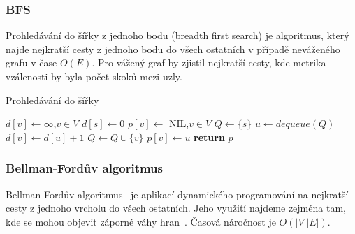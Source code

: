 \documentclass{bakalarka}
\begin{document}
\subsubsection{BFS}
Prohledávání do šířky z jednoho bodu (breadth first search) je algoritmus,
který najde nejkratší cesty z jednoho bodu do všech ostatních v případě
neváženého grafu v čase $O(E)$. Pro vážený graf by zjistil nejkratší cesty, kde
metrika vzálenosti by byla počet skoků mezi uzly.

\begin{center}
\begin{minipage}{\textwidth}
\begin{algorithm}[H]
	\caption{Prohledávání do šířky}
		\label{alg:bfs}
	\begin{algorithmic}[1]
	\Statex
		\State $d[v] \gets \infty$,$v \in V$
		\State $d[s] \gets 0$
		\State $p[v] \gets $ NIL,$v \in V$
		\State $Q \gets \{s\}$
			\State $u \gets dequeue(Q)$
					\State $d[v] \gets d[u] + 1$
					\State $Q \gets Q \cup \{v\}$
					\State $p[v] \gets u$
				\EndIf
			\EndFor
		\EndWhile
		\State \textbf{return} $p$
	\EndFunction
	\end{algorithmic}
\end{algorithm}
\end{minipage}
\end{center}
\mbox{}

\subsubsection{Bellman-Fordův algoritmus}
Bellman-Fordův algoritmus~\citep{bellmanford_algorithm} je aplikací dynamického
programování na nejkratší cesty z jednoho vrcholu do všech ostatních. Jeho
využití najdeme zejména tam, kde se mohou objevit záporné váhy
hran~\citep{CLRS}. Časová náročnost je $O(|V||E|)$.
\end{document}
